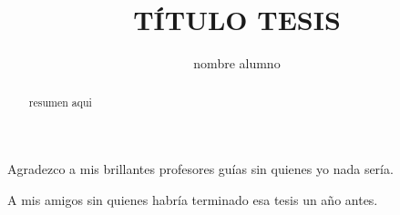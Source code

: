 \documentclass[12pt,spanish]{ucsc_thesis}
\begin{document}
\title{TÍTULO TESIS}

\author{nombre alumno}





\maketitle


\begin{agradecimientos} 	 
Agradezco a mis brillantes profesores guías sin quienes yo nada sería.
\end{agradecimientos}

\begin{dedicatoria} 	 
A mis amigos sin quienes habría terminado esa tesis un año antes.
\end{dedicatoria}


\begin{abstract}
resumen aqui
\end{abstract}

\tableofcontents
\listoffigures
\listoftables
\printnomenclature

\mainmatter








\appendix
\end{document}
